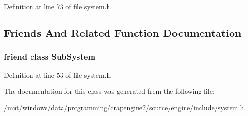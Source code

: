 Definition at line 73 of file system.\+h.



\subsection{Friends And Related Function Documentation}
\hypertarget{classcrap_1_1_system_ab7ef901c147ce6dec5b0d5fb1a8f7f98}{}
\subsubsection[{Sub\+System}]{\setlength{\rightskip}{0pt plus 5cm}friend class {\bf Sub\+System}\hspace{0.3cm}{\ttfamily [friend]}}\label{classcrap_1_1_system_ab7ef901c147ce6dec5b0d5fb1a8f7f98}


Definition at line 53 of file system.\+h.



The documentation for this class was generated from the following file\+:\begin{DoxyCompactItemize}
\item 
/mnt/windows/data/programming/crapengine2/source/engine/include/\hyperlink{system_8h}{system.\+h}\end{DoxyCompactItemize}
